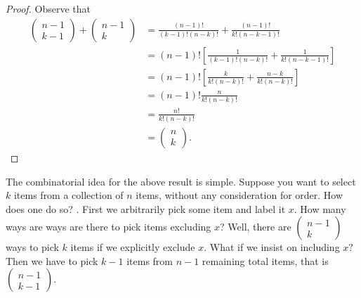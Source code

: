 \begin{proof}
Observe that 
\begin{align*}
\left(\begin{array}{c}
n-1\\
k-1
\end{array}\right)+\left(\begin{array}{c}
n-1\\
k
\end{array}\right) & =\frac{\left(n-1\right)!}{\left(k-1\right)!\left(n-k\right)!}+\frac{\left(n-1\right)!}{k!\left(n-k-1\right)!}\\
 & =\left(n-1\right)!\left[\frac{1}{\left(k-1\right)!\left(n-k\right)!}+\frac{1}{k!\left(n-k-1\right)!}\right]\\
 & =\left(n-1\right)!\left[\frac{k}{k!\left(n-k\right)!}+\frac{n-k}{k!\left(n-k\right)!}\right]\\
 & =\left(n-1\right)!\frac{n}{k!\left(n-k\right)!}\\
 & =\frac{n!}{k!\left(n-k\right)!}\\
 & =\left(\begin{array}{c}
n\\
k
\end{array}\right).
\end{align*}
\end{proof}
\begin{rem*}
The combinatorial idea for the above result is simple. Suppose you
want to select $k$ items from a collection of $n$ items, without
any consideration for order. How does one do so? . First we arbitrarily
pick some item and label it $x$. How many ways are ways are there
to pick items excluding $x$? Well, there are $\left(\begin{array}{c}
n-1\\
k
\end{array}\right)$ ways to pick $k$ items if we explicitly exclude $x$. What if we
insist on including $x?$ Then we have to pick $k-1$ items from $n-1$
remaining total items, that is $\left(\begin{array}{c}
n-1\\
k-1
\end{array}\right).$
\end{rem*}
